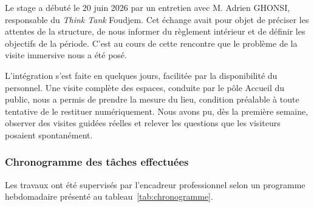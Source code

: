 Le stage a débuté le 20 juin 2026 par un entretien avec M. Adrien GHONSI,
responsable du \emph{Think Tank} Foudjem. Cet échange avait pour objet de
préciser les attentes de la structure, de nous informer du règlement intérieur
et de définir les objectifs de la période. C'est au cours de cette rencontre que
le problème de la visite immersive nous a été posé.

L'intégration s'est faite en quelques jours, facilitée par la disponibilité du
personnel. Une visite complète des espaces, conduite par le pôle Accueil du
public, nous a permis de prendre la mesure du lieu, condition préalable à toute
tentative de le restituer numériquement. Nous avons pu, dès la première semaine,
observer des visites guidées réelles et relever les questions que les visiteurs
posaient spontanément.

\subsubsection{Chronogramme des tâches effectuées}

Les travaux ont été supervisés par l'encadreur professionnel selon un programme
hebdomadaire présenté au tableau~\ref{tab:chronogramme}.

